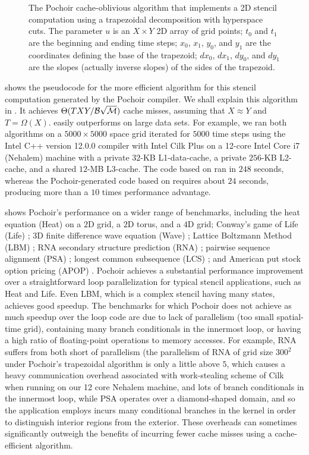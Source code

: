 \begin{figure}
\caption{%
  The Pochoir cache-oblivious algorithm that implements a 2D stencil
  computation using a trapezoidal decomposition with hyperspace cuts.
  The parameter $u$ is an $X\times Y$ 2D array of grid points; $t_0$
  and $t_1$ are the beginning and ending time steps; $x_0$, $x_1$,
  $y_0$, and $y_1$ are the coordinates defining the base of the
  trapezoid; $dx_0$, $dx_1$, $dy_0$, and $dy_1$ are the slopes
  (actually inverse slopes) of the sides of the trapezoid.}
\label{fig:trap-code}
\end{figure}

 shows the pseudocode for the more efficient
algorithm for this stencil computation generated by the Pochoir
compiler.  We shall explain this algorithm in .  It
achieves $\Theta(TXY/\cal B\sqrt{\cal M})$ cache misses, assuming that
$X\approx Y$ and $T=\Omega(X)$.   easily outperforms
 on large data sets.  For example, we ran both algorithms
on a $5000 \times 5000$ space grid iterated for $5000$ time steps
using the Intel C++ version 12.0.0 compiler with Intel Cilk Plus
\cite{IntelCilkPlus10} on a 12-core Intel Core i7 (Nehalem) machine
with a private $32$-KB L1-data-cache, a private $256$-KB L2-cache, and
a shared $12$-MB L3-cache.  The code based on  ran in
$248$ seconds, whereas the Pochoir-generated code based on 
requires about $24$ seconds, producing more than a $10$ times
performance advantage.

 shows Pochoir's performance on a wider range of
benchmarks, including
%
the heat equation (Heat) \cite{Epperson07} on a $2$D grid, a $2$D
torus, and a $4$D grid; Conway's game of Life (Life) \cite{Gardner70};
$3$D finite difference wave equation (Wave) \cite{Micikevicius09};
Lattice Boltzmann Method (LBM) \cite{MeiShYu00}; RNA secondary
structure prediction (RNA) \cite{ChowdhuryLeRa10,Akutsu00}; pairwise
sequence alignment (PSA) \cite{Gotoh82}; longest common subsequence
(LCS) \cite{CormenLeRi+09}; and American put stock option pricing
(APOP) \cite{John06}.
%
Pochoir achieves a substantial performance improvement over a
straightforward loop parallelization for typical stencil applications,
such as Heat and Life.  Even LBM, which is a complex stencil having
many states, achieves good speedup.  The benchmarks for which Pochoir
does not achieve as much speedup over the loop code are due to lack of
parallelism (too small spatial-time grid), containing
many branch conditionals in the innermost loop, or having a high ratio of
floating-point operations to memory accesses.  For example, RNA
suffers from both short of parallelism (the parallelism of RNA of grid 
size $300^2$ under Pochoir's trapezoidal algorithm is only a little above
$5$, which causes a heavy communication overhead associated with 
work-stealing scheme of Cilk when running on our 12 core Nehalem machine, 
and lots of branch conditionals in the innermost loop, while PSA operates 
over a diamond-shaped domain, and so the application employs incurs many
conditional branches in the kernel in order to distinguish interior
regions from the exterior.  These overheads can sometimes
significantly outweigh the benefits of incurring fewer cache misses
using a cache-efficient algorithm.

